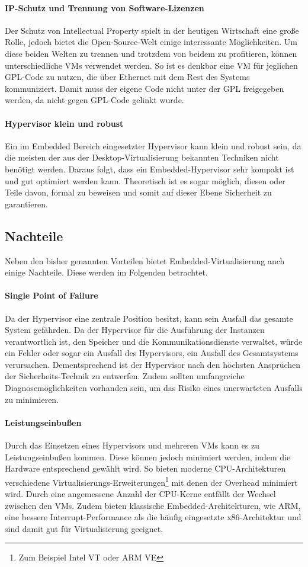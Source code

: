 \documentclass[
  a4paper,					    %
  twoside,
  DIV=calc,     				%
  bibliography=totoc,
  cleardoublepage=empty,
  ngerman,     					%
  final       					%
]{scrbook}
\begin{document}
\paragraph{IP-Schutz und Trennung von Software-Lizenzen}
Der Schutz von Intellectual Property spielt in der heutigen Wirtschaft eine große Rolle, jedoch bietet die Open-Source-Welt einige interessante Möglichkeiten. Um diese beiden Welten zu trennen und trotzdem von beidem zu profitieren, können unterschiedliche VMs verwendet werden. So ist es denkbar eine VM für jeglichen GPL-Code zu nutzen, die über Ethernet mit dem Rest des Systems kommuniziert. Damit muss der eigene Code nicht unter der GPL freigegeben werden, da nicht gegen GPL-Code gelinkt wurde.

\paragraph{Hypervisor klein und robust}
Ein im Embedded Bereich eingesetzter Hypervisor kann klein und robust sein, da die meisten der aus der Desktop-Virtualisierung bekannten Techniken nicht benötigt werden. Daraus folgt, dass ein Embedded-Hypervisor sehr kompakt ist und gut optimiert werden kann. Theoretisch ist es sogar möglich, diesen oder Teile davon, formal zu beweisen und somit auf dieser Ebene Sicherheit zu garantieren.

\subsection{Nachteile}
Neben den bisher genannten Vorteilen bietet Embedded-Virtualisierung auch einige Nachteile. Diese werden im Folgenden betrachtet.

\paragraph{Single Point of Failure}
Da der Hypervisor eine zentrale Position besitzt, kann sein Ausfall das gesamte System gefährden. Da der Hypervisor für die Ausführung der Instanzen verantwortlich ist, den Speicher und die Kommunikationsdienste verwaltet, würde ein Fehler oder sogar ein Ausfall des Hypervisors, ein Ausfall des Gesamtsystems verursachen. Dementsprechend ist der Hypervisor nach den höchsten Ansprüchen der Sicherheits-Technik zu entwerfen. Zudem sollten umfangreiche Diagnosemöglichkeiten vorhanden sein, um das Risiko eines unerwarteten Ausfalls zu minimieren.

\paragraph{Leistungseinbußen}
Durch das Einsetzen eines Hypervisors und mehreren VMs kann es zu Leistungseinbußen kommen. Diese können jedoch minimiert werden, indem die Hardware entsprechend gewählt wird. So bieten moderne CPU-Architekturen verschiedene Virtualisierungs-Erweiterungen\footnote{Zum Beispiel Intel VT oder ARM VE} mit denen der Overhead minimiert wird. Durch eine angemessene Anzahl der CPU-Kerne entfällt der Wechsel zwischen den VMs. Zudem bieten klassische Embedded-Architekturen, wie ARM, eine bessere Interrupt-Performance als die häufig eingesetzte x86-Architektur und sind damit gut für Virtualisierung geeignet.\cite{okl4}
\end{document}

